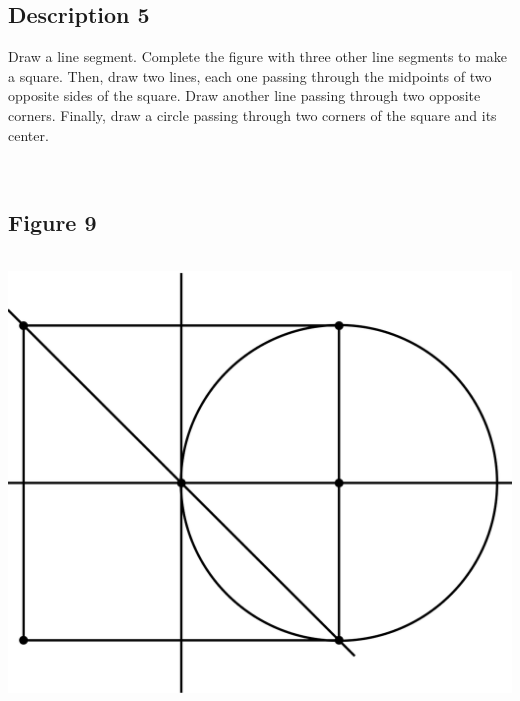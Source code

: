 \documentclass[12pt,a4paper,article,english,firamath]{nsi}
\begin{document}
\maketitle

\subsection*{Description 5}
{\brettley 

Draw a line segment. Complete the figure with three other line segments to make a square. Then, draw two lines, each one
passing through the midpoints of two opposite sides of the square. Draw another line passing through two opposite
corners. Finally, draw a circle passing through two corners of the square and its center.}\\[1em]



\subsection*{Figure 9}
\begin{center}
    \includegraphics[height=12cm]{img/fig05.png}
\end{center}
\end{document}
